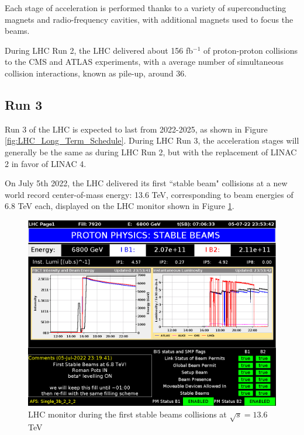 Each stage of acceleration is performed thanks to a variety of superconducting magnets and radio-frequency cavities, with additional magnets used to focus the beams.

During LHC Run 2, the LHC delivered about 156 fb$^{-1}$ of proton-proton collisions to the CMS and ATLAS experiments, with a average number of simultaneous collision interactions, known as pile-up, around 36. 


\subsection{Run 3}

Run 3 of the LHC is expected to last from 2022-2025, as shown in Figure \ref{fig:LHC_Long_Term_Schedule}. During LHC Run 3, the acceleration stages will generally be the same as during LHC Run 2, but with the replacement of LINAC 2 in favor of LINAC 4. 

On July 5th 2022, the LHC delivered its first ``stable beam" collisions at a new world record center-of-mass energy: 13.6 TeV, corresponding to beam energies of 6.8 TeV each, displayed on the LHC monitor shown in Figure \ref{fig:LHCMonitor_first13p6TeV}. 

\begin{figure}[H]
    \centering
    \includegraphics[width=\textwidth]{Images/LHC/First_13p6TeV_Collisions.png}
    \caption{LHC monitor during the first stable beams collisions at $\sqrt{s} = 13.6$ TeV}
    \label{fig:LHCMonitor_first13p6TeV}
\end{figure}

